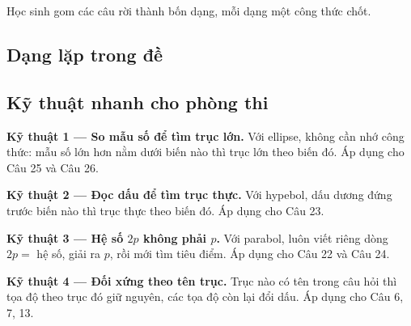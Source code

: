 \documentclass[11pt, a4paper]{article}
\begin{document}
Học sinh gom các câu rời thành bốn dạng, mỗi dạng một công thức chốt.

\subsection{Dạng lặp trong đề}


\subsection{Kỹ thuật nhanh cho phòng thi}

\textbf{Kỹ thuật 1 — So mẫu số để tìm trục lớn.} Với ellipse, không cần nhớ công thức: mẫu số lớn hơn nằm dưới biến nào thì trục lớn theo biến đó. Áp dụng cho Câu 25 và Câu 26.

\textbf{Kỹ thuật 2 — Đọc dấu để tìm trục thực.} Với hypebol, dấu dương đứng trước biến nào thì trục thực theo biến đó. Áp dụng cho Câu 23.

\textbf{Kỹ thuật 3 — Hệ số $2p$ không phải $p$.} Với parabol, luôn viết riêng dòng $2p = $ hệ số, giải ra $p$, rồi mới tìm tiêu điểm. Áp dụng cho Câu 22 và Câu 24.

\textbf{Kỹ thuật 4 — Đối xứng theo tên trục.} Trục nào có tên trong câu hỏi thì tọa độ theo trục đó giữ nguyên, các tọa độ còn lại đổi dấu. Áp dụng cho Câu 6, 7, 13.
\end{document}
